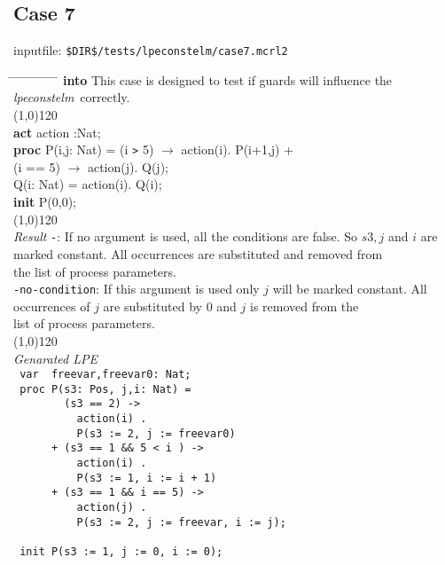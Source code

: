 \index{}\documentclass[a4paper,10pt]{article}
\theoremstyle{plain}
\theoremstyle{definition}
\newcommand{\tool}{\textit{lpeconstelm}}
\newcommand{\pps}{process parameters}
\newcommand{\ti}{\textit}
\newcommand{\tb}{\textbf}
\newcommand{\tabw}{\hspace*{15.mm} \= \hspace*{20.mm} \= \hspace*{5.mm} \= \hspace*{5.mm} \= \hspace*{5.mm} \= \hspace*{5.mm}  \= \hspace*{5.mm}  \= \hspace*{5.mm}  \= \hspace*{5.mm} \= \hspace*{5.mm} \= \hspace*{5.mm}  \= \hspace*{5.mm}  \= \hspace*{5.mm}\kill}
\begin{document}
\subsection*{Case 7}
inputfile: \verb"$DIR$/tests/lpeconstelm/case7.mcrl2"
\begin{tabbing}
\tabw
\tb{into} \> This case is designed to test if guards will influence the \tool\ correctly.\\
\line(1,0){120}\\
\tb{act}  \> action :Nat;\\
\tb{proc} \> P(i,j: Nat) =  \>  (i \verb">" 5) $\rightarrow$ action(i). P(i+1,j) +\\
          \>                \> (i == 5)        $\rightarrow$ action(j). Q(j);\\
          \> Q(i: Nat)   = \>                                action(i). Q(i);\\

\tb{init} \>  P(0,0);\\
\line(1,0){120}\\
\ti{Result} \> \verb"-": \> \> If no argument is used, all the conditions are false. So $s3, j$ and $i$ are \\
\> \> \>  marked constant. All occurrences are substituted and removed from \\
\> \> \> the list of \pps .\\
\> \verb"-no-condition": \> \> If this argument is used only $j$ will be marked constant. All \\ 
\> \> \> occurrences of $j$ are substituted by 0 and $j$ is removed from the \\
\> \> \> list of \pps .\\
\line(1,0){120}\\
\ti{Genarated LPE} \\
\>  \verb" var  freevar,freevar0: Nat;"\\                            
\>  \verb" proc P(s3: Pos, j,i: Nat) = "\\                           
\>  \verb"        (s3 == 2) ->          "\\                          
\>  \verb"          action(i) .          "\\                         
\>  \verb"          P(s3 := 2, j := freevar0)"\\                     
\>  \verb"      + (s3 == 1 && 5 < i ) ->      "\\                    
\>  \verb"          action(i) .               "\\                    
\>  \verb"          P(s3 := 1, i := i + 1)  "\\                      
\>  \verb"      + (s3 == 1 && i == 5) ->   "\\                       
\>  \verb"          action(j) .          "\\                         
\>  \verb"          P(s3 := 2, j := freevar, i := j);"\\             
\>  \verb"                 "\\                                       
\>  \verb" init P(s3 := 1, j := 0, i := 0);"\\  
\end{tabbing}
\newpage
\end{document}
